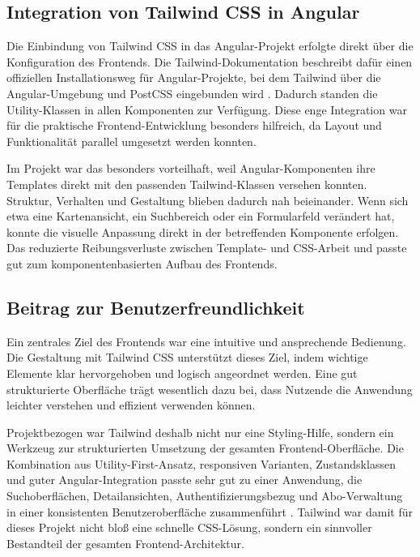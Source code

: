 \subsection{Integration von Tailwind CSS in Angular}
Die Einbindung von Tailwind CSS in das Angular-Projekt erfolgte direkt \"uber die Konfiguration des Frontends. Die Tailwind-Dokumentation beschreibt daf\"ur einen offiziellen Installationsweg f\"ur Angular-Projekte, bei dem Tailwind \"uber die Angular-Umgebung und PostCSS eingebunden wird \cite{tailwind_angular}. Dadurch standen die Utility-Klassen in allen Komponenten zur Verf\"ugung. Diese enge Integration war f\"ur die praktische Frontend-Entwicklung besonders hilfreich, da Layout und Funktionalit\"at parallel umgesetzt werden konnten.

Im Projekt war das besonders vorteilhaft, weil Angular-Komponenten ihre Templates direkt mit den passenden Tailwind-Klassen versehen konnten. Struktur, Verhalten und Gestaltung blieben dadurch nah beieinander. Wenn sich etwa eine Kartenansicht, ein Suchbereich oder ein Formularfeld ver\"andert hat, konnte die visuelle Anpassung direkt in der betreffenden Komponente erfolgen. Das reduzierte Reibungsverluste zwischen Template- und CSS-Arbeit und passte gut zum komponentenbasierten Aufbau des Frontends.

\subsection{Beitrag zur Benutzerfreundlichkeit}
Ein zentrales Ziel des Frontends war eine intuitive und ansprechende Bedienung. Die Gestaltung mit Tailwind CSS unterst\"utzt dieses Ziel, indem wichtige Elemente klar hervorgehoben und logisch angeordnet werden. Eine gut strukturierte Oberfl\"ache tr\"agt wesentlich dazu bei, dass Nutzende die Anwendung leichter verstehen und effizient verwenden k\"onnen.

Projektbezogen war Tailwind deshalb nicht nur eine Styling-Hilfe, sondern ein Werkzeug zur strukturierten Umsetzung der gesamten Frontend-Oberfl\"ache. Die Kombination aus Utility-First-Ansatz, responsiven Varianten, Zustandsklassen und guter Angular-Integration passte sehr gut zu einer Anwendung, die Suchoberfl\"achen, Detailansichten, Authentifizierungsbezug und Abo-Verwaltung in einer konsistenten Benutzeroberfl\"ache zusammenf\"uhrt \cite{tailwind_utility,tailwind_responsive,tailwind_states,tailwind_angular}. Tailwind war damit f\"ur dieses Projekt nicht blo\ss{} eine schnelle CSS-L\"osung, sondern ein sinnvoller Bestandteil der gesamten Frontend-Architektur.

